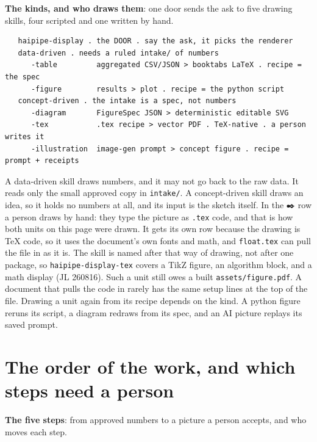 \textbf{The kinds, and who draws them}: one door sends the ask to five drawing skills, four scripted and one written by hand.

\begin{verbatim}
   haipipe-display . the DOOR . say the ask, it picks the renderer
   data-driven . needs a ruled intake/ of numbers
      -table         aggregated CSV/JSON > booktabs LaTeX . recipe = the spec
      -figure        results > plot . recipe = the python script
   concept-driven . the intake is a spec, not numbers
      -diagram       FigureSpec JSON > deterministic editable SVG
      -tex           .tex recipe > vector PDF . TeX-native . a person writes it
      -illustration  image-gen prompt > concept figure . recipe = prompt + receipts
\end{verbatim}
A data-driven skill draws numbers, and it may not go back to the raw data. It reads only the small approved copy in \texttt{intake/}. A concept-driven skill draws an idea, so it holds no numbers at all, and its input is the sketch itself. In the ✒️ row a person draws by hand: they type the picture as \texttt{.tex} code, and that is how both units on this page were drawn. It gets its own row because the drawing is TeX code, so it uses the document's own fonts and math, and \texttt{float.tex} can pull the file in as it is. The skill is named after that way of drawing, not after one package, so \texttt{haipipe-display-tex} covers a TikZ figure, an algorithm block, and a math display (JL 260816). Such a unit still owes a built \texttt{assets/figure.pdf}. A document that pulls the code in rarely has the same setup lines at the top of the file. Drawing a unit again from its recipe depends on the kind. A python figure reruns its script, a diagram redraws from its spec, and an AI picture replays its saved prompt.


\section{The order of the work, and which steps need a person}
\textbf{The five steps}: from approved numbers to a picture a person accepts, and who moves each step.

